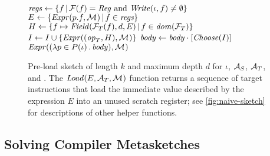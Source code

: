 \begin{figure}[h]
\begin{algorithmic}[1]
            \State $\mathit{regs} \gets \{ f \,|\, \mathcal{F}(f) = \mathit{Reg} \text{ and } \mathit{Write}(\iota,f) \neq \emptyset \}$ 
            \State $E \gets \{\mathit{Expr}(p.f, \mathcal{M}_{}) \,|\, f\in\mathit{regs}\}$ 
            \State $H \gets \{ f\mapsto \mathit{Field}(\mathcal{F}_T(f),d,E) \,|\, f\in\mathit{dom}(\mathcal{F}_T)\} $  
            \State $I\gets I \cup \{ \mathit{Expr}((\mathit{op}_T, H),\mathcal{M}_{}) \}$ 
          \EndIf
        \EndFor
        \State $\mathit{body} \gets \mathit{body} \cdot [\mathit{Choose}(I)]$ 
      \EndFor
      \State \Return $\mathit{Expr}((\lambda p\in P(\iota)\, .\, \mathit{body}),\mathcal{M}_{})$ 
    \EndFunction
  \end{algorithmic}
  \caption{Pre-load sketch of length $k$ and maximum depth $d$ for $\iota$,
  $\mathcal{A}_S$, $\mathcal{A}_T$, and \Map. The $\mathit{Load}(E, \mathcal{A}_T, \mathcal{M}_{})$ function
  returns a sequence of target instructions that load the immediate value
  described by the expression $E$ into an unused scratch register; see
  \autoref{fig:naive-sketch} for descriptions of other helper
  functions.\tighten}\label{fig:lcs-sketch}
\end{figure}


\subsection{Solving Compiler Metasketches}\label{s:algorithm:solving}

